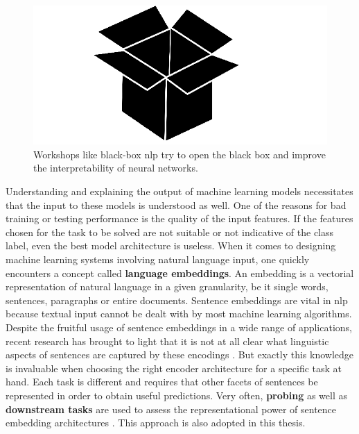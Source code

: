 \begin{figure}
  	\begin{center}
    		\includegraphics[scale=0.3]{images/black_box}
		\caption[Opening the black box to improve interpretability]{Workshops like black-box \gls{nlp} try to open the black box and improve the
			interpretability of neural networks.}
  	\end{center}
\end{figure}

Understanding and explaining the output of machine learning models necessitates that the input to these models is understood as well. One of the reasons for bad training or testing performance is the quality of the input features. If the features chosen for the task to be solved are not suitable or not indicative of the class label, even the best model architecture is useless. When it comes to designing machine learning systems involving natural language input, one quickly encounters a concept called \textbf{language embeddings}. An embedding is a vectorial representation of natural language in a given granularity, be it single words, sentences, paragraphs or entire documents. Sentence embeddings are vital in \gls{nlp} because textual input cannot be dealt with by most machine learning algorithms. Despite the fruitful usage of sentence embeddings in a wide range of applications, recent research has brought to light that it is not at all clear what linguistic aspects of sentences are captured by these encodings \citep[inter alia]{Conneau.2018a}. But exactly this knowledge is invaluable when choosing the right encoder architecture for a specific task at hand. Each task is different and requires that other facets of sentences be represented in order to obtain useful predictions. Very often, \textbf{probing} as well as \textbf{downstream tasks} are used to assess the representational power of sentence embedding architectures \citep[inter alia]{Conneau.2018b}. This approach is also adopted in this thesis.

